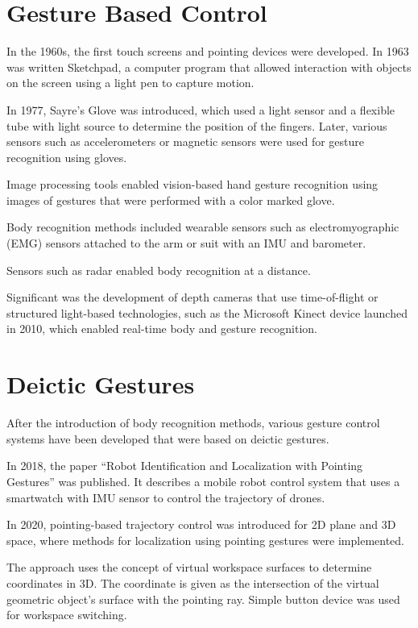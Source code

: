 \section{Gesture Based Control}
In the 1960s, the first touch screens and pointing devices were developed. In 1963 was written Sketchpad, a computer program that allowed interaction with objects on the screen using a light pen to capture motion.\par
In 1977, Sayre's Glove was introduced, which used a light sensor and a flexible tube with light source to determine the position of the fingers. Later, various sensors such as accelerometers or magnetic sensors were used for gesture recognition using gloves.\par
Image processing tools enabled vision-based hand gesture recognition using images of gestures that were performed with a color marked glove.\par
Body recognition methods included wearable sensors such as electromyographic (EMG) sensors attached to the arm or suit with an IMU and barometer.\par
Sensors such as radar enabled body recognition at a distance.\par

Significant was the development of depth cameras that use time-of-flight or structured light-based technologies, such as the Microsoft Kinect device launched in 2010, which enabled real-time body and gesture recognition.\par

\section{Deictic Gestures}
After the introduction of body recognition methods, various gesture control systems have been developed that were based on deictic gestures.\par
In 2018, the paper “Robot Identification and Localization with Pointing Gestures” was published. It describes a mobile robot control system that uses a smartwatch with IMU sensor to control the trajectory of drones.\par
In 2020, pointing-based trajectory control was introduced for 2D plane and 3D space, where methods for localization using pointing gestures were implemented.\par
The approach uses the concept of virtual workspace surfaces to determine coordinates in 3D. The coordinate is given as the intersection of the virtual geometric object's surface with the pointing ray. Simple button device was used for workspace switching.\par
 
